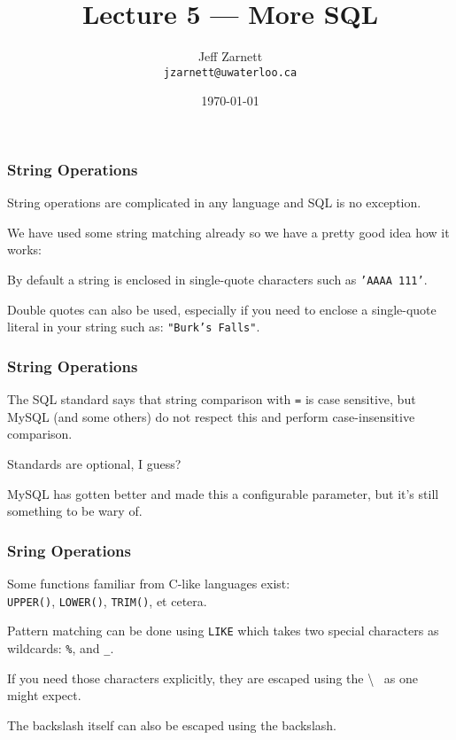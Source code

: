 

\title{Lecture 5 --- More SQL }

\author{Jeff Zarnett \\ \small \texttt{jzarnett@uwaterloo.ca}}
\date{\today}




\begin{frame}
  \titlepage

 \end{frame}



\begin{frame}
\frametitle{String Operations}

String operations are complicated in any language and SQL is no exception. 

We have used some string matching already so we have a pretty good idea how it works: 

By default a string is enclosed in single-quote characters such as \texttt{'AAAA 111'}. 

Double quotes can also be used, especially if you need to enclose a single-quote literal in your string such as: \texttt{"Burk's Falls"}.

\end{frame}



\begin{frame}
\frametitle{String Operations}

The SQL standard says that string comparison with \texttt{=} is case sensitive, but MySQL (and some others) do not respect this and perform case-insensitive comparison. 

Standards are optional, I guess? 

MySQL has gotten better and made this a configurable parameter, but it's still something to be wary of.


\end{frame}



\begin{frame}
\frametitle{Sring Operations}

Some functions familiar from C-like languages exist:\\
\quad  \texttt{UPPER()}, \texttt{LOWER()}, \texttt{TRIM()}, et cetera. 

Pattern matching can be done using \texttt{LIKE} which takes two special characters as wildcards: \texttt{\%}, and \texttt{\_}.  

If you need those characters explicitly, they are escaped using the \textbackslash~ as one might expect. 

The backslash itself can also be escaped using the backslash.

\end{frame}


